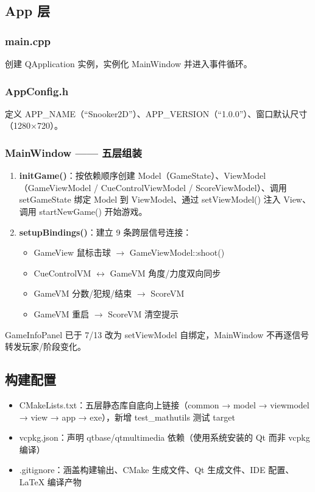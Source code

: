 \documentclass[11pt]{ctexart}
\begin{document}
\subsection{App 层}

\subsubsection{main.cpp}

创建 QApplication 实例，实例化 MainWindow 并进入事件循环。

\subsubsection{AppConfig.h}

定义 APP\_NAME（``Snooker2D''）、APP\_VERSION（``1.0.0''）、窗口默认尺寸（1280×720）。

\subsubsection{MainWindow —— 五层组装}

\begin{enumerate}[leftmargin=*]
\item \textbf{initGame()}：按依赖顺序创建 Model（GameState）、ViewModel（GameViewModel / CueControlViewModel / ScoreViewModel）、调用 setGameState 绑定 Model 到 ViewModel、通过 setViewModel() 注入 View、调用 startNewGame() 开始游戏。
\item \textbf{setupBindings()}：建立 9 条跨层信号连接：
  \begin{itemize}
  \item GameView 鼠标击球 $\to$ GameViewModel::shoot()
  \item CueControlVM $\leftrightarrow$ GameVM 角度/力度双向同步
  \item GameVM 分数/犯规/结束 $\to$ ScoreVM
  \item GameVM 重启 $\to$ ScoreVM 清空提示
  \end{itemize}
\end{enumerate}

GameInfoPanel 已于 7/13 改为 setViewModel 自绑定，MainWindow 不再逐信号转发玩家/阶段变化。

\subsection{构建配置}

\begin{itemize}
\item CMakeLists.txt：五层静态库自底向上链接（common → model → viewmodel → view → app → exe），新增 test\_mathutils 测试 target
\item vcpkg.json：声明 qtbase/qtmultimedia 依赖（使用系统安装的 Qt 而非 vcpkg 编译）
\item .gitignore：涵盖构建输出、CMake 生成文件、Qt 生成文件、IDE 配置、LaTeX 编译产物
\end{itemize}
\end{document}
